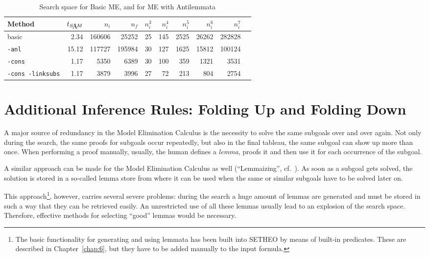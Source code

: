 \begin{table}[htb]
\begin{center}
\begin{tabular}{|l|r|r|r||r|r|r|r|r|r|}
\hline
Method & $t_{\SAM}$ & $n_i$ & $n_f$ & 
	$n_i^3$ & $n_i^4$ & $n_i^5$ & $n_i^6$ & $n_i^7$ \\
\hline\hline
basic & 2.34 & 160606 & 25252 &
	25 & 145 & 2525 & 26262 & 282828 \\
\hline
{\tt -anl} & 15.12 & 117727 & 195984 &
	30 & 127 & 1625 & 15812 & 100124 \\
\hline
{\tt -cons} & 1.17 & 5350 & 6389 &
	30 & 100 & 359 & 1321 & 3531 \\
\hline
{\tt -cons -linksubs} & 1.17 & 3879 & 3996 &
	27 & 72 & 213 & 804 & 2754 \\
\hline\hline
\end{tabular}
\end{center}
\caption{Search space for Basic ME, and for ME with Antilemmata}
\label{tab:tut2:results.anl}
\end{table}



\section{Additional Inference Rules: Folding Up and Folding Down}

A major source of redundancy in the Model Elimination Calculus is
the necessity to solve the same subgoals over and over again.
Not only during the search, the same proofs for subgoals occur
repeatedly, but also in the final tableau, the same subgoal can show
up more than once. 
When performing a proof manually, usually, the human defines a {\em lemma\/},
proofs it and then use it for each occurrence of the subgoal.

A similar approach can be made for the Model Elimination Calculus as well
(``Lemmaizing'', cf.\ \cite{METEOR}). As soon as a subgoal gets solved,
the solution is stored in a so-called lemma store from where it can be used
when the same or similar subgoals have to be solved later on.

This approach\footnote{
	The basic functionality for generating and using lemmata has
	been built into SETHEO by means of built-in predicates. 
	These are described in Chapter~\ref{chap:6}, but they
	have to be added manually to the input formula.},
however, carries several severe problems: 
during the search a huge amount of lemmas are generated and must be stored
in such a way that they can be retrieved easily. An unrestricted use of
all these lemmas usually lead to an explosion of the search space.
Therefore, effective methods for selecting ``good'' lemmas would be
necessary.


